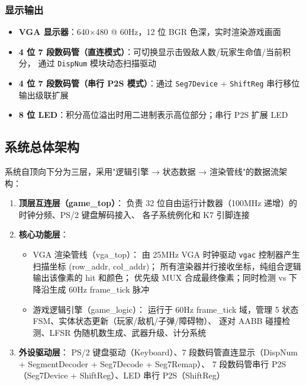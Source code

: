 \documentclass[12pt,a4paper]{ctexart}
\begin{document}
\subsubsection{显示输出}

\begin{itemize}
    \item \textbf{VGA 显示器}：640$\times$480 @ 60Hz，12 位 BGR 色深，实时渲染游戏画面
    \item \textbf{4 位 7 段数码管（直连模式）}：可切换显示击毁敌人数/玩家生命值/当前积分，
    通过 \texttt{DispNum} 模块动态扫描驱动
    \item \textbf{4 位 7 段数码管（串行 P2S 模式）}：通过 \texttt{Seg7Device} + \texttt{ShiftReg}
    串行移位输出级联扩展
    \item \textbf{8 位 LED}：积分高位溢出时用二进制表示高位部分；串行 P2S 扩展 LED
\end{itemize}

\subsection{系统总体架构}

系统自顶向下分为三层，采用"逻辑引擎 → 状态数据 → 渲染管线"的数据流架构：

\begin{enumerate}[label=(\arabic*)]
    \item \textbf{顶层互连层（game\_top）}：
    负责 32 位自由运行计数器（100MHz 递增）的时钟分频、PS/2 键盘解码接入、
    各子系统例化和 K7 引脚连接
    \item \textbf{核心功能层}：
    \begin{itemize}
        \item VGA 渲染管线（vga\_top）：
        由 25MHz VGA 时钟驱动 \texttt{vgac} 控制器产生扫描坐标 (row\_addr, col\_addr)；
        所有渲染器并行接收坐标，纯组合逻辑输出该像素的 hit 和颜色；
        优先级 MUX 合成最终像素；同时检测 vs 下降沿生成 60Hz frame\_tick 脉冲
        \item 游戏逻辑引擎（game\_logic）：
        运行于 60Hz frame\_tick 域，管理 5 状态 FSM、实体状态更新（玩家/敌机/子弹/障碍物）、
        逐对 AABB 碰撞检测、LFSR 伪随机数生成、武器升级、计分系统
    \end{itemize}
    \item \textbf{外设驱动层}：
     PS/2 键盘驱动（Keyboard）、7 段数码管直连显示（DispNum + SegmentDecoder + Seg7Decode + Seg7Remap）、
    7 段数码管串行 P2S（Seg7Device + ShiftReg）、LED 串行 P2S（ShiftReg）
\end{enumerate}
\end{document}
